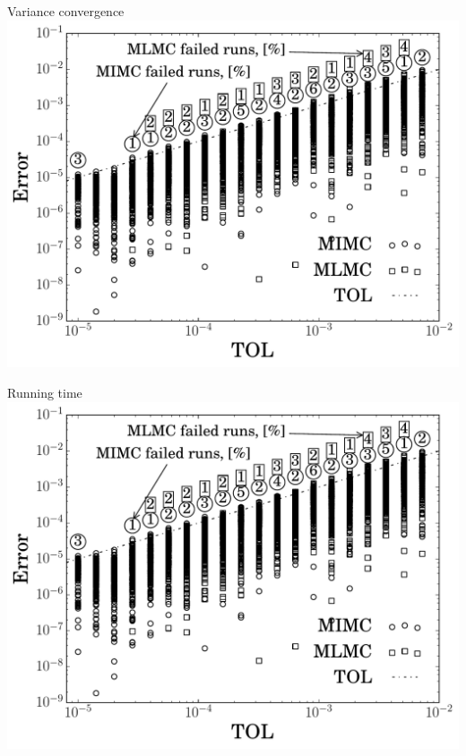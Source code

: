 \begin{frame}{Variance convergence}\centering
  \includegraphics[page=9, scale=0.5]{src/imgs/mckean}
\end{frame}


\begin{frame}{Running time}\centering
  \includegraphics[page=5, scale=0.5]{src/imgs/mckean}
\end{frame}


